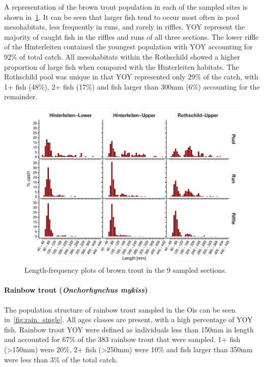 A representation of the brown trout population in each of the sampled sites is shown in~\cref{fig:brown_mix}.
It can be seen that larger fish tend to occur most often in pool mesohabitats, less frequently in runs, and rarely in riffles.
YOY represent the majority of caught fish in the riffles and runs of all three sections.
The lower riffle of the Hinterleiten contained the youngest population with YOY accounting for 92\% of total catch.
All mesohabitats within the Rothschild showed a higher proportion of large fish when compared with the Hinterleiten habitats.
The Rothschild pool was unique in that YOY represented only 29\% of the catch, with 1+ fish (48\%), 2+ fish (17\%) and fish larger than 300mm (6\%) accounting for the remainder.

\begin{figure}[!htb]                              %
	\center
	\includegraphics[width=\textwidth]{images/brown_mix}                %
	\caption{Length-frequency plots of brown trout in the 9 sampled sections.}        %
	\label{fig:brown_mix}                                                       %
\end{figure}


\paragraph{Rainbow trout (\textit{Onchorhynchus mykiss})}\label{sec:ois_rt_lf}

The population structure of rainbow trout sampled in the Ois can be seen in~\cref{fig:rain_single}.
All ages classes are present, with a high percentage of YOY fish.
Rainbow trout YOY were defined as individuals less than 150mm in length and accounted for 67\% of the 383 rainbow trout that were sampled.
1+ fish (\textgreater150mm) were 20\%, 2+ fish (\textgreater250mm) were 10\% and fish larger than 350mm were less than 3\% of the total catch.

